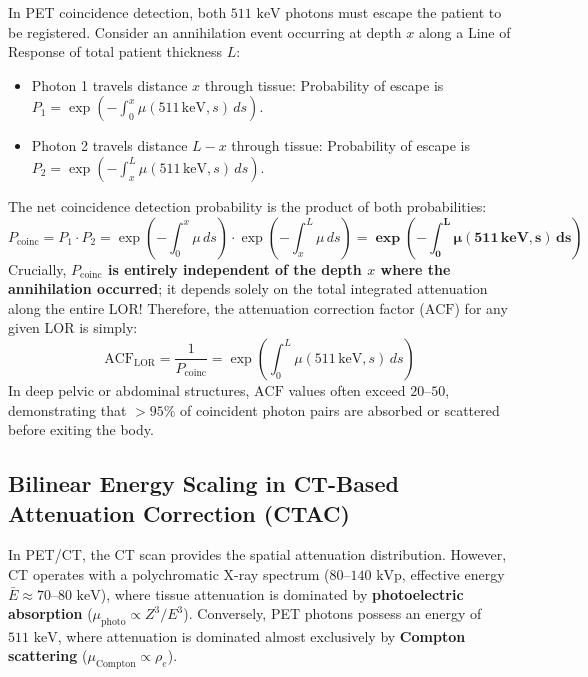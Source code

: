 \documentclass[11pt,a4paper]{article}
\begin{document}
\begin{physicsbox}
In PET coincidence detection, both $511\text{ keV}$ photons must escape the patient to be registered. Consider an annihilation event occurring at depth $x$ along a Line of Response of total patient thickness $L$:
\begin{itemize}
    \item Photon 1 travels distance $x$ through tissue: Probability of escape is $P_1 = \exp\left( -\int_0^x \mu(511\,\text{keV}, s) \, ds \right)$.
    \item Photon 2 travels distance $L - x$ through tissue: Probability of escape is $P_2 = \exp\left( -\int_x^L \mu(511\,\text{keV}, s) \, ds \right)$.
\end{itemize}
The net coincidence detection probability is the product of both probabilities:
\begin{equation}
    P_{\text{coinc}} = P_1 \cdot P_2 = \exp\left( -\int_0^x \mu \, ds \right) \cdot \exp\left( -\int_x^L \mu \, ds \right) = \mathbf{\exp\left( -\int_0^L \mu(511\,\text{keV}, s) \, ds \right)}
\end{equation}
Crucially, \textbf{$P_{\text{coinc}}$ is entirely independent of the depth $x$ where the annihilation occurred}; it depends solely on the total integrated attenuation along the entire LOR! Therefore, the attenuation correction factor ($\text{ACF}$) for any given LOR is simply:
\begin{equation}
    \text{ACF}_{\text{LOR}} = \frac{1}{P_{\text{coinc}}} = \exp\left( \int_0^L \mu(511\,\text{keV}, s) \, ds \right)
\end{equation}
In deep pelvic or abdominal structures, $\text{ACF}$ values often exceed $20\text{--}50$, demonstrating that $> 95\%$ of coincident photon pairs are absorbed or scattered before exiting the body.
\end{physicsbox}

\subsection{Bilinear Energy Scaling in CT-Based Attenuation Correction (CTAC)}
In PET/CT, the CT scan provides the spatial attenuation distribution. However, CT operates with a polychromatic X-ray spectrum ($80\text{--}140\text{ kVp}$, effective energy $\bar{E} \approx 70\text{--}80\text{ keV}$), where tissue attenuation is dominated by \textbf{photoelectric absorption} ($\mu_{\text{photo}} \propto Z^3 / E^3$). Conversely, PET photons possess an energy of $511\text{ keV}$, where attenuation is dominated almost exclusively by \textbf{Compton scattering} ($\mu_{\text{Compton}} \propto \rho_e$).
\end{document}
